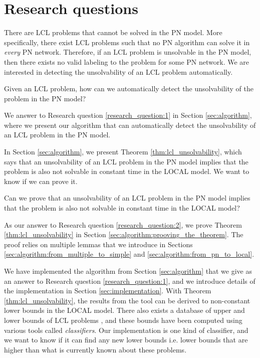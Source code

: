 
\section{Research questions} \label{sec:research_question}

There are LCL problems that cannot be solved in the PN model.
More specifically, there exist LCL problems such that no PN algorithm can solve it in \emph{every} PN network.
Therefore, if an LCL problem is unsolvable in the PN model, then there exists no valid labeling to the problem for some PN network.
We are interested in detecting the unsolvability of an LCL problem automatically.

\begin{researchquestion} \label{research_question:1}
Given an LCL problem, how can we automatically detect the unsolvability of the problem in the PN model?
\end{researchquestion}

We answer to Research question \ref{research_question:1} in Section \ref{sec:algorithm}, where we present our algorithm that can automatically detect the unsolvability of an LCL problem in the PN model.

In Section \ref{sec:algorithm}, we present Theorem \ref{thm:lcl_unsolvability}, which says that an unsolvability of an LCL problem in the PN model implies that the problem is also not solvable in constant time in the LOCAL model.
We want to know if we can prove it.

\begin{researchquestion} \label{research_question:2}
Can we prove that an unsolvability of an LCL problem in the PN model implies that the problem is also not solvable in constant time in the LOCAL model?
\end{researchquestion}

As our answer to Research question \ref{research_question:2}, we prove Theorem \ref{thm:lcl_unsolvability} in Section \ref{sec:algorithm:prooving_the_theorem}.
The proof relies on multiple lemmas that we introduce in Sections \ref{sec:algorithm:from_multiple_to_simple} and \ref{sec:algorithm:from_pn_to_local}.

We have implemented the algorithm from Section \ref{sec:algorithm} that we give as an answer to Research question \ref{research_question:1}, and we introduce details of the implementation in Section \ref{sec:implementation}.
With Theorem \ref{thm:lcl_unsolvability}, the results from the tool can be derived to non-constant lower bounds in the LOCAL model.
There also exists a database of upper and lower bounds of LCL problems \cite{Tereshchenko2021}, and these bounds have been computed using various tools called \emph{classifiers}.
Our implementation is one kind of classifier, and we want to know if it can find any new lower bounds i.e. lower bounds that are higher than what is currently known about these problems.

